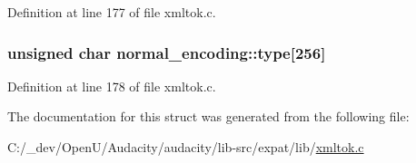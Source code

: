 Definition at line 177 of file xmltok.\+c.

\subsubsection[{\texorpdfstring{type}{type}}]{\setlength{\rightskip}{0pt plus 5cm}unsigned char normal\+\_\+encoding\+::type\mbox{[}256\mbox{]}}\hypertarget{structnormal__encoding_a518fe4e08d162386bf7d4e9af22d6921}{}\label{structnormal__encoding_a518fe4e08d162386bf7d4e9af22d6921}


Definition at line 178 of file xmltok.\+c.



The documentation for this struct was generated from the following file\+:\begin{DoxyCompactItemize}
\item 
C\+:/\+\_\+dev/\+Open\+U/\+Audacity/audacity/lib-\/src/expat/lib/\hyperlink{xmltok_8c}{xmltok.\+c}\end{DoxyCompactItemize}
